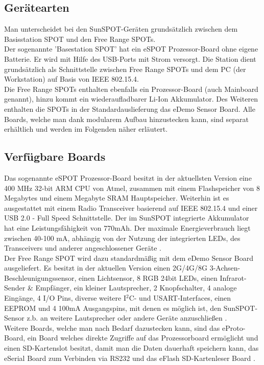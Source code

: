 
\subsection{Gerätearten}\label{ss:Geraetearten}
Man unterscheidet bei den SunSPOT-Geräten grundsätzlich zwischen dem Basisstation SPOT und den Free Range SPOTs.\\

Der sogenannte 'Basestation SPOT' hat ein eSPOT Prozessor-Board ohne eigene Batterie. Er wird mit Hilfe des USB-Ports mit Strom versorgt. Die Station dient grundsätzlich als Schnittstelle zwischen Free Range SPOTs und dem PC (der Workstation) auf Basis von IEEE 802.15.4.\\

Die Free Range SPOTs enthalten ebenfalls ein Prozessor-Board (auch Mainboard genannt), hinzu kommt ein wiederaufladbarer Li-Ion Akkumulator. Des Weiteren enthalten die SPOTs in der Standardauslieferung das eDemo Sensor Board. Alle Boards, welche man dank modularem Aufbau hinzustecken kann, sind separat erhältlich und werden im Folgenden näher erläutert.

\subsection{Verfügbare Boards}\label{ss:VerfuegbareBoards}
Das sogenannte eSPOT Prozessor-Board besitzt in der aktuellsten Version eine 400 MHz 32-bit ARM CPU von Atmel, zusammen mit einem Flashspeicher von 8 Megabytes und einem Megabyte SRAM Hauptspeicher. Weiterhin ist es ausgestattet mit einem Radio Transceiver basierend auf IEEE 802.15.4 und einer USB 2.0 - Full Speed Schnittstelle. Der im SunSPOT integrierte Akkumulator hat eine Leistungsfähigkeit von 770mAh. Der maximale Energieverbrauch liegt zwischen 40-100 mA, abhängig von der Nutzung der integrierten LEDs, des Transceivers und anderer angeschlossener Geräte \cite{d:horan} \cite{d:spotmain}.  \\

Der Free Range SPOT wird dazu standardmäßig mit dem eDemo Sensor Board ausgeliefert. Es besitzt in der aktuellen Version einen 2G/4G/8G 3-Achsen-Beschleunigungssensor, einen Lichtsensor, 8 RGB 24bit LEDs, einen Infrarot-Sender \& Empfänger, ein kleiner Lautsprecher, 2 Knopfschalter, 4 analoge Eingänge, 4 I/O Pins, diverse weitere I$^2$C- und USART-Interfaces, einen EEPROM und 4 100mA Ausgangspins, mit denen es möglich ist, den SunSPOT-Sensor z.b. an weitere Lautsprecher oder andere Geräte anzuschließen \cite{d:horan} \cite{d:spotdemo}. \\

Weitere Boards, welche man nach Bedarf dazustecken kann, sind das eProto-Board, ein Board welches direkte Zugriffe auf das Prozessorboard ermöglicht und einen SD-Kartenslot besitzt, damit man die Daten dauerhaft speichern kann, das eSerial Board zum Verbinden via RS232 und das eFlash SD-Kartenleser Board \cite{d:horan}. \\